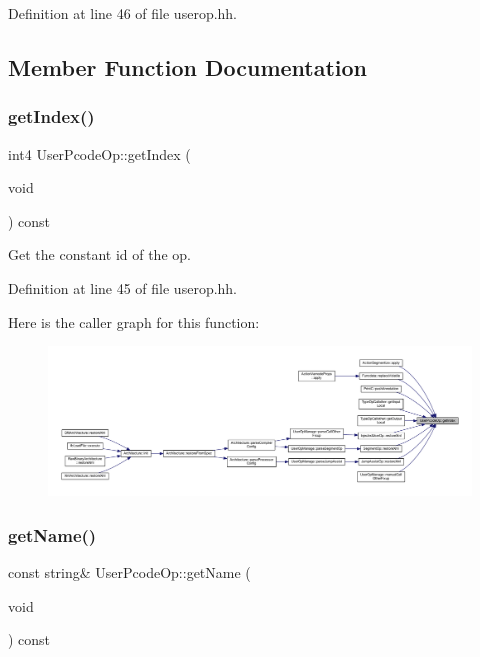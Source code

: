 Definition at line 46 of file userop.\+hh.



\subsection{Member Function Documentation}
\mbox{\label{class_user_pcode_op_afdeaf916b1559b26a65abb2b2d649870}} 
\subsubsection{\texorpdfstring{getIndex()}{getIndex()}}
{\footnotesize\ttfamily int4 User\+Pcode\+Op\+::get\+Index (\begin{DoxyParamCaption}\item[{void}]{ }\end{DoxyParamCaption}) const\hspace{0.3cm}{\ttfamily [inline]}}



Get the constant id of the op. 



Definition at line 45 of file userop.\+hh.

Here is the caller graph for this function\+:
\nopagebreak
\begin{figure}[H]
\begin{center}
\leavevmode
\includegraphics[width=350pt]{class_user_pcode_op_afdeaf916b1559b26a65abb2b2d649870_icgraph}
\end{center}
\end{figure}
\mbox{\label{class_user_pcode_op_a580a157f5fa5a71f323f5fd59627d5c9}} 
\subsubsection{\texorpdfstring{getName()}{getName()}}
{\footnotesize\ttfamily const string\& User\+Pcode\+Op\+::get\+Name (\begin{DoxyParamCaption}\item[{void}]{ }\end{DoxyParamCaption}) const\hspace{0.3cm}{\ttfamily [inline]}}



